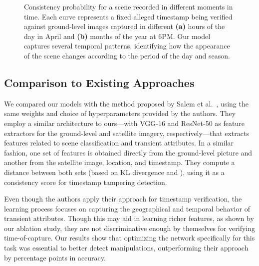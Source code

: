 \documentclass[journal]{IEEEtran}
\begin{document}
       \begin{figure*}[!t]
            \centering
            \hfill
            
            \caption{Consistency probability for a scene recorded in different moments in time. Each curve represents a fixed alleged timestamp being verified against ground-level images captured in different \textbf{(a)} hours of the day in April and \textbf{(b)} months of the year at 6\textsc{PM}. Our model captures several temporal patterns, identifying how the appearance of the scene changes according to the period of the day and season.}
            \label{fig:consistency_variation}
        \end{figure*}
        
    \subsection{Comparison to Existing Approaches}\label{sec:exp_comparison_sota}        
        We compared our models with the method proposed by Salem et al.~\cite{salem2020learning}, using the same weights and choice of hyperparameters provided by the authors. They employ a similar architecture to ours---with VGG-16 and ResNet-50 as feature extractors for the ground-level and satellite imagery, respectively---that extracts features related to scene classification and transient attributes. In a similar fashion, one set of features is obtained directly from the ground-level picture and another from the satellite image, location, and timestamp. They compute a distance between both sets (based on KL divergence and ), using it as a consistency score for timestamp tampering detection. 
        
        Even though the authors apply their approach for timestamp verification, the learning process focuses on capturing the geographical and temporal behavior of transient attributes. Though this may aid in learning richer features, as shown by our ablation study, they are not discriminative enough by themselves for verifying time-of-capture. Our results show that optimizing the network specifically for this task was essential to better detect manipulations, outperforming their approach by  percentage points in accuracy.
        
\end{document}
